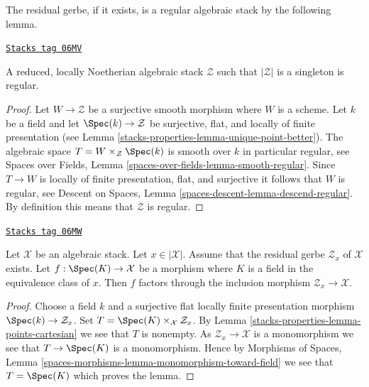 The residual gerbe, if it exists, is a regular algebraic stack
by the following lemma.

\begin{lemma}
\label{stacks-properties-lemma-residual-gerbe-regular}
\href{https://stacks.math.columbia.edu/tag/06MV}{\texttt{Stacks tag 06MV}}

A reduced, locally Noetherian algebraic stack $\mathcal{Z}$ such that
$|\mathcal{Z}|$ is a singleton is regular.
\end{lemma}

\begin{proof}
Let $W \to \mathcal{Z}$ be a surjective smooth morphism where $W$ is a scheme.
Let $k$ be a field and let $\Spec(k) \to \mathcal{Z}$ be surjective,
flat, and locally of finite presentation (see
Lemma \ref{stacks-properties-lemma-unique-point-better}).
The algebraic space $T = W \times_\mathcal{Z} \Spec(k)$ is
smooth over $k$ in particular regular, see
Spaces over Fields, Lemma \ref{spaces-over-fields-lemma-smooth-regular}.
Since $T \to W$ is locally of finite presentation, flat, and surjective it
follows that $W$ is regular, see
Descent on Spaces, Lemma \ref{spaces-descent-lemma-descend-regular}.
By definition this means that $\mathcal{Z}$ is regular.
\end{proof}

\begin{lemma}
\label{stacks-properties-lemma-residual-gerbe-points}
\href{https://stacks.math.columbia.edu/tag/06MW}{\texttt{Stacks tag 06MW}}

Let $\mathcal{X}$ be an algebraic stack. Let $x \in |\mathcal{X}|$.
Assume that the residual gerbe $\mathcal{Z}_x$ of $\mathcal{X}$ exists.
Let $f : \Spec(K) \to \mathcal{X}$ be a morphism where $K$ is a field
in the equivalence class of $x$. Then $f$ factors through the inclusion
morphism $\mathcal{Z}_x \to \mathcal{X}$.
\end{lemma}

\begin{proof}
Choose a field $k$ and a surjective flat locally finite presentation
morphism $\Spec(k) \to \mathcal{Z}_x$. Set
$T = \Spec(K) \times_\mathcal{X} \mathcal{Z}_x$. By
Lemma \ref{stacks-properties-lemma-points-cartesian}
we see that $T$ is nonempty. As $\mathcal{Z}_x \to \mathcal{X}$
is a monomorphism we see that $T \to \Spec(K)$ is a monomorphism.
Hence by
Morphisms of Spaces, Lemma
\ref{spaces-morphisms-lemma-monomorphism-toward-field}
we see that $T = \Spec(K)$ which proves the lemma.
\end{proof}

